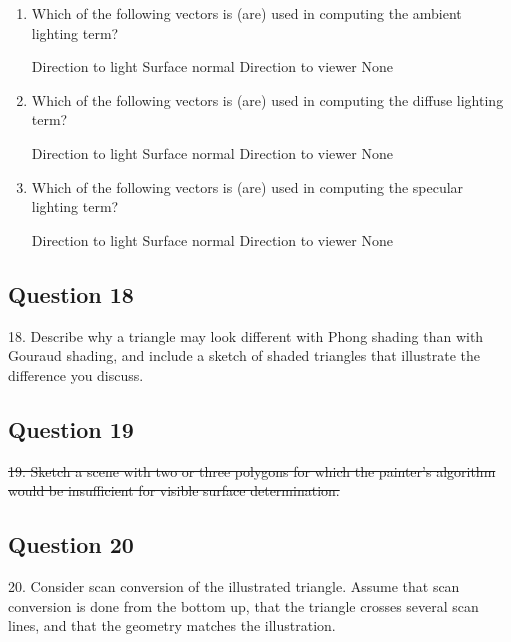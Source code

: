 \documentclass[11pt]{article}
\begin{document}
\begin{spacing}{1.2}
\begin{enumerate}[label=\arabic*)]
	\item Which of the following vectors is (are) used in computing the ambient lighting term?
	
	Direction to light \qquad Surface normal \qquad Direction to viewer \qquad None
	\item Which of the following vectors is (are) used in computing the diffuse lighting term?
	
	Direction to light \qquad Surface normal \qquad Direction to viewer \qquad None
	\item Which of the following vectors is (are) used in computing the specular lighting term?
		
	Direction to light \qquad Surface normal \qquad Direction to viewer \qquad None

\end{enumerate}

\subsection{Question 18}
18.  Describe why a triangle may look different with Phong shading than with Gouraud shading, and include a sketch of shaded triangles that illustrate the difference you discuss. 

\subsection{Question 19}
\sout{19.  Sketch a scene with two or three polygons for which the painter's algorithm would be insufficient for visible surface determination.  }

\subsection{Question 20}
20.  Consider scan conversion of the illustrated triangle.  Assume that scan conversion is done from the bottom up, that the triangle crosses several scan lines, and that the geometry matches the illustration.  



\end{spacing}
\end{document}
